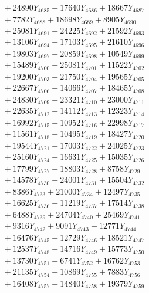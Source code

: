\documentclass[a4paper,10pt]{article}
\begin{document}
{\begin{align}
&\;  + 24890 Y_{4685} + 17640 Y_{4686} + 18667 Y_{4687} \\[0.3ex]
&\;  + 7782 Y_{4688} + 18698 Y_{4689} + 8905 Y_{4690} \\[0.3ex]
&\;  + 25081 Y_{4691} + 24225 Y_{4692} + 21592 Y_{4693} \\[0.3ex]
&\;  + 13106 Y_{4694} + 17103 Y_{4695} + 21610 Y_{4696} \\[0.3ex]
&\;  + 19803 Y_{4697} + 20859 Y_{4698} + 10549 Y_{4699} \\[0.3ex]
&\;  + 15489 Y_{4700} + 25081 Y_{4701} + 11522 Y_{4702} \\[0.3ex]
&\;  + 19200 Y_{4703} + 21750 Y_{4704} + 19565 Y_{4705} \\[0.3ex]
&\;  + 22667 Y_{4706} + 14066 Y_{4707} + 18465 Y_{4708} \\[0.5ex]\allowbreak
&\;  + 24830 Y_{4709} + 23321 Y_{4710} + 23000 Y_{4711} \\[0.3ex]
&\;  + 22635 Y_{4712} + 14112 Y_{4713} + 12323 Y_{4714} \\[0.3ex]
&\;  + 16992 Y_{4715} + 10952 Y_{4716} + 22998 Y_{4717} \\[0.3ex]
&\;  + 11561 Y_{4718} + 10495 Y_{4719} + 18427 Y_{4720} \\[0.3ex]
&\;  + 19544 Y_{4721} + 17003 Y_{4722} + 24025 Y_{4723} \\[0.3ex]
&\;  + 25160 Y_{4724} + 16631 Y_{4725} + 15035 Y_{4726} \\[0.3ex]
&\;  + 17799 Y_{4727} + 18803 Y_{4728} + 8758 Y_{4729} \\[0.3ex]
&\;  + 14578 Y_{4730} + 24001 Y_{4731} + 15504 Y_{4732} \\[0.3ex]
&\;  + 8386 Y_{4733} + 21000 Y_{4734} + 12497 Y_{4735} \\[0.3ex]
&\;  + 16625 Y_{4736} + 11219 Y_{4737} + 17514 Y_{4738} \\[0.5ex]\allowbreak
&\;  + 6488 Y_{4739} + 24704 Y_{4740} + 25469 Y_{4741} \\[0.3ex]
&\;  + 9316 Y_{4742} + 9091 Y_{4743} + 12771 Y_{4744} \\[0.3ex]
&\;  + 16476 Y_{4745} + 12729 Y_{4746} + 18521 Y_{4747} \\[0.3ex]
&\;  + 12537 Y_{4748} + 14716 Y_{4749} + 15773 Y_{4750} \\[0.3ex]
&\;  + 13730 Y_{4751} + 6741 Y_{4752} + 16762 Y_{4753} \\[0.3ex]
&\;  + 21135 Y_{4754} + 10869 Y_{4755} + 7883 Y_{4756} \\[0.3ex]
&\;  + 16408 Y_{4757} + 14840 Y_{4758} + 19379 Y_{4759} \\[0.3ex]

\end{align}}
\end{document}
